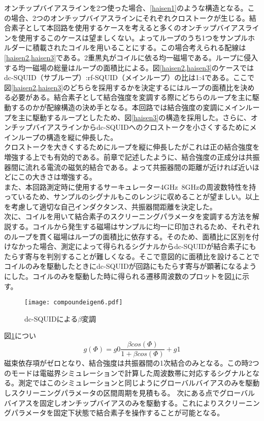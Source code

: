     オンチップバイアスラインを2つ使った場合、\ref*{haisen1}のような構造となる。この場合、2つのオンチップバイアスラインにそれぞれクロストークが生じる。結合素子として本回路を使用するケースを考えると多くのオンチップバイアスラインを使用するこのケースは望ましくない。よってループのうち1つをサンプルホルダーに積載されたコイルを用いることにする。この場合考えられる配線は\ref*{haisen2,haisen3}である。2重黒丸がコイルに依る均一磁場である。ループに侵入する均一磁場の総量はループの面積比による。図\ref*{haisen2,haisen3}のケースではdc-SQUID（サブループ）:rf-SQUID（メインループ）の比は1:4である。ここで図\ref*{haisen2,haisen3}のどちらを採用するかを決定するにはループの面積比を決める必要がある。結合素子として結合強度を変調する際にどちらのループを主に駆動するのかが配線構造の決め手となる。本回路では結合強度の変調にメインループを主に駆動するループとしたため、図\ref*{haisen3}の構造を採用した。さらに、オンチップバイアスラインからdc-SQUIDへのクロストークを小さくするためにメインループの構造を縦に伸長した。\\
    クロストークを大きくするためにループを縦に伸長したがこれは正の結合強度を増強する上でも有効的である。前章で記述したように、結合強度の正成分は共振器間に流れる電流の磁気的結合である。よって共振器間の距離が近ければ近いほどにこの大きさは増強する。\\
    また、本回路測定時に使用するサーキュレーター4GHz~8GHzの周波数特性を持っているため、サンプルのシグナルもこのレンジに収めることが望ましい。以上を考慮して適切な自己インダクタンス、共振器間距離を決定した。\\
    次に、コイルを用いて結合素子のスクリーニングパラメータを変調する方法を解説する。コイルから発生する磁場はサンプルに均一に印加されるため、それぞれのループを貫く磁場はループの面積比に依存する。そのため、面積比に区別を付けなかった場合、測定によって得られるシグナルからdc-SQUIDが結合素子にもたらす寄与を判別することが難しくなる。そこで意図的に面積比を設けることでコイルのみを駆動したときにdc-SQUIDが回路にもたらす寄与が顕著になるようにした。コイルのみを駆動した時に得られる遷移周波数のプロットを図\ref*{beta変調}に示す。
    \begin{figure}[H]
        \centering
        \texttt{[image: compoundeigen6.pdf]}
        \caption{dc-SQUIDによる$\beta$変調}
        \label{beta変調}
    \end{figure}
    図\ref*{beta変調}につい
    \begin{equation}
        g(\Phi) = g0\frac{\beta cos(\Phi)}{1+\beta cos(\Phi)} + g1
    \end{equation}
        磁束依存項がゼロとなり、結合強度は共振器間の1次結合のみとなる。この時2つのモードは電磁界シミュレーションで計算した周波数帯に対応するシグナルとなる。測定ではこのシミュレーションと同じようにグローバルバイアスのみを駆動しスクリーニングパラメータの区間周期を見積もる。
        次にある点でグローバルバイアスを固定しオンチップバイアスのみを駆動する。これによりスクリーニングパラメータを固定下状態で結合素子を操作することが可能となる。
